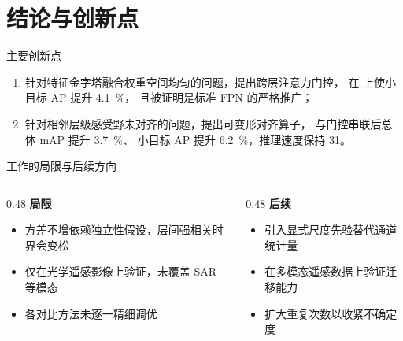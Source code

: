 \section{结论与创新点}

\begin{frame}{主要创新点}
  \begin{enumerate}
    \setlength{\itemsep}{1.0em}
    \item 针对特征金字塔融合权重空间均匀的问题，提出跨层注意力门控，
          在 \dataset{} 上使小目标 AP 提升 \qty{4.1}{\percent}，
          且被证明是标准 FPN 的严格推广；
    \item 针对相邻层级感受野未对齐的问题，提出可变形对齐算子，
          与门控串联后总体 mAP 提升 \qty{3.7}{\percent}、
          小目标 AP 提升 \qty{6.2}{\percent}，推理速度保持 \qty{31}{\fps}。
  \end{enumerate}
\end{frame}

\begin{frame}{工作的局限与后续方向}
  \begin{columns}[T, onlytextwidth]
    \begin{column}{0.48\textwidth}
      \textbf{局限}
      \begin{itemize}
        \setlength{\itemsep}{0.6em}
        \item 方差不增依赖独立性假设，层间强相关时界会变松
        \item 仅在光学遥感影像上验证，未覆盖 SAR 等模态
        \item 各对比方法未逐一精细调优
      \end{itemize}
    \end{column}
    \begin{column}{0.48\textwidth}
      \textbf{后续}
      \begin{itemize}
        \setlength{\itemsep}{0.6em}
        \item 引入显式尺度先验替代通道统计量
        \item 在多模态遥感数据上验证迁移能力
        \item 扩大重复次数以收紧不确定度
      \end{itemize}
    \end{column}
  \end{columns}

\end{frame}
